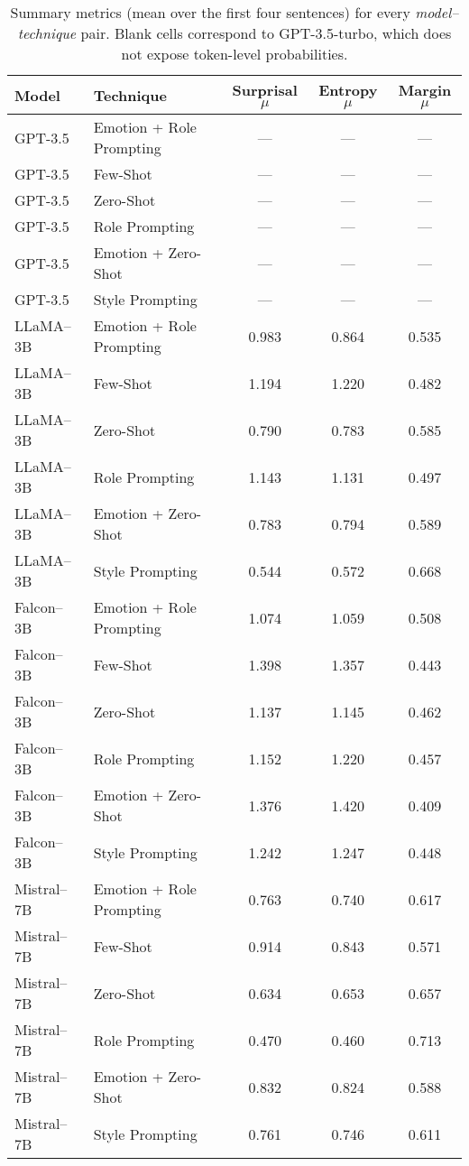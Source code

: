 \documentclass[12pt]{article}
\begin{document}
\begin{table}[h]
\centering
\caption{Summary metrics (mean over the first four sentences) for every \textit{model–technique} pair. Blank cells correspond to GPT-3.5-turbo, which does not expose token-level probabilities.}
\label{tab:summary_metrics}
\begin{tabular}{llccc}
\toprule
\textbf{Model} & \textbf{Technique} & \textbf{Surprisal $\mu$} & \textbf{Entropy $\mu$} & \textbf{Margin $\mu$} \\
\midrule
GPT-3.5 & Emotion + Role Prompting & --- & --- & --- \\
GPT-3.5 & Few-Shot                & --- & --- & --- \\
GPT-3.5 & Zero-Shot               & --- & --- & --- \\
GPT-3.5 & Role Prompting          & --- & --- & --- \\
GPT-3.5 & Emotion + Zero-Shot     & --- & --- & --- \\
GPT-3.5 & Style Prompting         & --- & --- & --- \\
LLaMA--3B & Emotion + Role Prompting & 0.983 & 0.864 & 0.535 \\
LLaMA--3B & Few-Shot                & 1.194 & 1.220 & 0.482 \\
LLaMA--3B & Zero-Shot               & 0.790 & 0.783 & 0.585 \\
LLaMA--3B & Role Prompting          & 1.143 & 1.131 & 0.497 \\
LLaMA--3B & Emotion + Zero-Shot     & 0.783 & 0.794 & 0.589 \\
LLaMA--3B & Style Prompting         & 0.544 & 0.572 & 0.668 \\
Falcon--3B & Emotion + Role Prompting & 1.074 & 1.059 & 0.508 \\
Falcon--3B & Few-Shot                & 1.398 & 1.357 & 0.443 \\
Falcon--3B & Zero-Shot               & 1.137 & 1.145 & 0.462 \\
Falcon--3B & Role Prompting          & 1.152 & 1.220 & 0.457 \\
Falcon--3B & Emotion + Zero-Shot     & 1.376 & 1.420 & 0.409 \\
Falcon--3B & Style Prompting         & 1.242 & 1.247 & 0.448 \\
Mistral--7B & Emotion + Role Prompting & 0.763 & 0.740 & 0.617 \\
Mistral--7B & Few-Shot                & 0.914 & 0.843 & 0.571 \\
Mistral--7B & Zero-Shot               & 0.634 & 0.653 & 0.657 \\
Mistral--7B & Role Prompting          & 0.470 & 0.460 & 0.713 \\
Mistral--7B & Emotion + Zero-Shot     & 0.832 & 0.824 & 0.588 \\
Mistral--7B & Style Prompting         & 0.761 & 0.746 & 0.611 \\
\bottomrule
\end{tabular}
\end{table}
\end{document}
